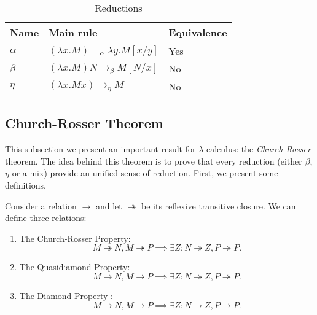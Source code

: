 
\begin{table}[h]
  \begin{center}
    \begin{tabular}{|l|l|l|}
      \hline
      Name & Main rule & Equivalence \\
      \hline
      $\alpha$ & $ (\lambda x. M) =_\alpha \lambda y. M[x/y]$& Yes\\
      $\beta$ & $(\lambda x.M)N \to_\beta M[N/x]$& No\\
      $\eta$ & ${\displaystyle (\lambda x.Mx) \to_\eta M }$& No\\
      \hline
    \end{tabular}
  \end{center}
  \caption{\label{tab:reductions}Reductions}
\end{table}


\subsection{Church-Rosser Theorem}

This subsection we present an important result for $\lambda$-calculus: the \emph{Church-Rosser} theorem. The idea behind this theorem is to prove that every reduction (either $\beta$, $\eta$ or a mix) provide an unified sense of reduction. First, we present some definitions.

\begin{definition}
  Consider a relation $\to$ and let $\twoheadrightarrow$ be its reflexive transitive closure. We can define three relations:

  \begin{enumerate}
  \item The Church-Rosser Property: $$M\twoheadrightarrow N, M\twoheadrightarrow P \implies \exists Z : N\twoheadrightarrow Z, P\twoheadrightarrow P.$$
  \item The Quasidiamond Property: $$M\to N, M\to P \implies \exists Z : N\twoheadrightarrow Z, P\twoheadrightarrow P.$$
  \item The Diamond Property : $$M\to N, M\to P \implies \exists Z : N\to Z,P\to P.$$
  \end{enumerate}
\end{definition}

